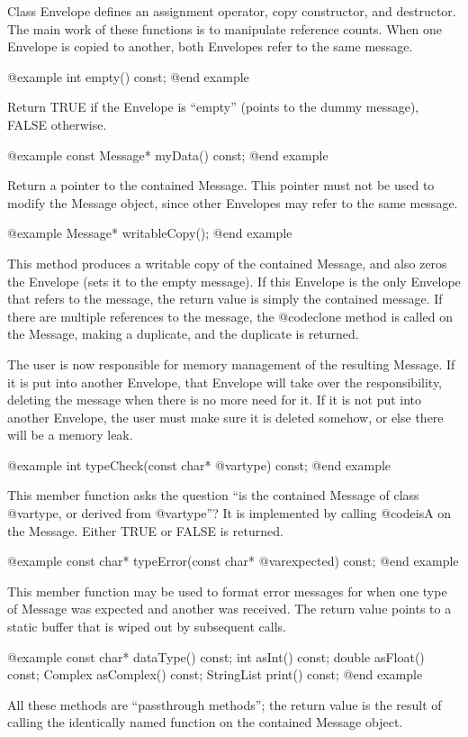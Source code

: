 Class Envelope defines an assignment operator, copy constructor, and
destructor.  The main work of these functions is to manipulate reference
counts.  When one Envelope is copied to another, both Envelopes refer
to the same message.

@example
int empty() const;
@end example

Return TRUE if the Envelope is ``empty'' (points to the dummy message),
FALSE otherwise.

@example
const Message* myData() const;
@end example

Return a pointer to the contained Message.  This pointer must not be
used to modify the Message object, since other Envelopes may refer to
the same message.

@example
Message* writableCopy();
@end example

This method produces a writable copy of the contained Message, and
also zeros the Envelope (sets it to the empty message).  If this
Envelope is the only Envelope that refers to the message, the
return value is simply the contained message.  If there are multiple
references to the message, the @code{clone} method is called on the
Message, making a duplicate, and the duplicate is returned.

The user is now responsible for memory management of the resulting
Message.  If it is put into another Envelope, that Envelope will
take over the responsibility, deleting the message when there is
no more need for it.  If it is not put into another Envelope, the
user must make sure it is deleted somehow, or else there will be
a memory leak.

@example
int typeCheck(const char* @var{type}) const;
@end example

This member function asks the question ``is the contained Message
of class @var{type}, or derived from @var{type}''?  It is implemented by
calling @code{isA} on the Message.  Either TRUE or FALSE is returned.

@example
const char* typeError(const char* @var{expected}) const;
@end example

This member function may be used to format error messages for when
one type of Message was expected and another was received.  The
return value points to a static buffer that is wiped out by subsequent
calls.

@example
const char* dataType() const;
int asInt() const;
double asFloat() const;
Complex asComplex() const;
StringList print() const;
@end example

All these methods are ``passthrough methods''; the return value is the
result of calling the identically named function on the contained
Message object.

